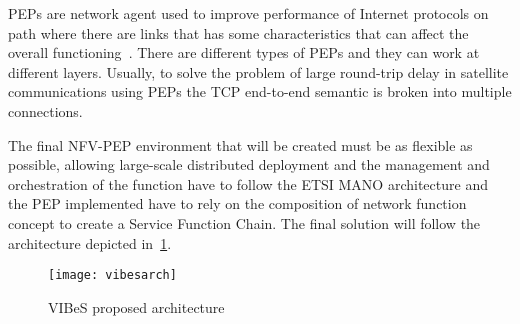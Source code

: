 PEPs are network agent used to improve performance of Internet protocols on path
where there are links that has some characteristics that can affect the overall
functioning~\cite{border2001rfc3135}. There are different types of PEPs and
they can work at different layers. Usually, to solve the problem of large
round-trip delay in satellite communications using PEPs the TCP end-to-end
semantic is broken into multiple connections.

The final NFV-PEP environment that will be created must be as flexible as
possible, allowing large-scale distributed deployment and the
management and orchestration of the function have to follow the ETSI MANO
architecture and the PEP implemented have to rely on the composition of
network function concept to create a Service Function Chain. The final solution
will follow the architecture depicted in~\ref{chap:background:img:vibesarch}.

\begin{figure}[h]
  \centering
  \texttt{[image: vibesarch]}
  \caption[VIBeS proposed architecture]{VIBeS proposed
  architecture~\cite{vibesesa}}
  \label{chap:background:img:vibesarch}
\end{figure}